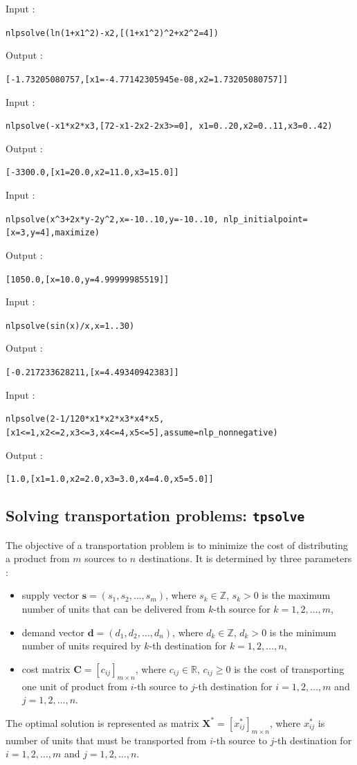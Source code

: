 \documentclass[a4paper,11pt]{book}
\begin{document}
Input :
\begin{center}
	\tt nlpsolve(ln(1+x1\^{}2)-x2,[(1+x1\^{}2)\^{}2+x2\^{}2=4])
\end{center}
Output :
\begin{center}
	\tt [-1.73205080757,[x1=-4.77142305945e-08,x2=1.73205080757]]
\end{center}
Input :
\begin{center}
	\tt nlpsolve(-x1*x2*x3,[72-x1-2x2-2x3>=0],
	x1=0..20,x2=0..11,x3=0..42)
\end{center}
Output :
\begin{center}
	\tt [-3300.0,[x1=20.0,x2=11.0,x3=15.0]]
\end{center}
Input :
\begin{center}
	\tt nlpsolve(x\^{}3+2x*y-2y\^{}2,x=-10..10,y=-10..10,
	nlp\_initialpoint=[x=3,y=4],maximize)
\end{center}
Output :
\begin{center}
	\tt [1050.0,[x=10.0,y=4.99999985519]]
\end{center}
Input :
\begin{center}
	\tt nlpsolve(sin(x)/x,x=1..30)
\end{center}
Output :
\begin{center}
	\tt [-0.217233628211,[x=4.49340942383]]
\end{center}
Input :
\begin{center}
	\tt nlpsolve(2-1/120*x1*x2*x3*x4*x5,
	[x1<=1,x2<=2,x3<=3,x4<=4,x5<=5],assume=nlp\_nonnegative)
\end{center}
Output :
\begin{center}
	\tt [1.0,[x1=1.0,x2=2.0,x3=3.0,x4=4.0,x5=5.0]]
\end{center}

\subsection{Solving transportation problems: {\tt tpsolve}}
The objective of a transportation problem is to minimize the cost of distributing a product from $ m $ sources to $ n $ destinations. It is determined by three parameters :
\begin{itemize}
\item supply vector $ \mathbf{s}=(s_1,s_2,\dots,s_m) $, where $ s_k\in\mathbb{Z} $, $ s_k>0 $ is the maximum number of units that can be delivered from $ k $-th source for $ k=1,2,\dots,m $,
\item demand vector $ \mathbf{d}=(d_1,d_2,\dots,d_n) $, where $ d_k\in\mathbb{Z} $, $ d_k>0 $ is the minimum number of units required by $ k $-th destination for $ k=1,2,\dots,n $,
\item cost matrix $ \mathbf{C}=[c_{ij}]_{m\times n} $, where $ c_{ij}\in\mathbb{R} $, $ c_{ij}\geq 0 $ is the cost of transporting one unit of product from $ i $-th source to $ j $-th destination for $ i=1,2,\dots,m $ and $ j=1,2,\dots,n $.
\end{itemize}
The optimal solution is represented as matrix $ \mathbf{X}^*=[x^*_{ij}]_{m\times n} $, where $ x^*_{ij} $ is number of units that must be transported from $ i $-th source to $ j $-th destination for $ i=1,2,\dots,m $ and $ j=1,2,\dots,n $.
\end{document}
